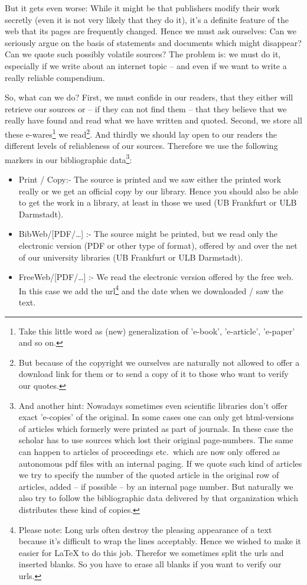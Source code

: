 But it gets even worse: While it might be that publishers modify their work
secretly (even it is not very likely that they do it), it's a definite feature
of the web that its pages are fre\-quen\-tly changed. Hence we must ask
ourselves: Can we seriously argue on the basis of statements and documents which
might disappear? Can we quote such possibly volatile sources? The problem is: we
must do it, especially if we write about an internet topic -- and even if we want
to write a really reliable compendium.

So, what can we do? First, we must confide in our readers, that they either
will retrieve our sources or -- if they can not find them -- that they
believe that we really have found and read what we have written and
quoted. Second, we store all these e-wares\footnote{Take this little word as
(new) generalization of 'e-book', 'e-article', 'e-paper' and so on.} we
read\footnote{But because of the copyright we ourselves are naturally not
allowed to offer a download link for them or to send a copy of it to those who
want to verify our quotes.}. And thirdly we should lay open to our readers the
different levels of reliableness of our sources. Therefore we use
the following markers in our bibliographic data\footnote{And another hint: Nowadays sometimes
even scientific libraries don't offer exact 'e-copies' of the original. In
some cases one can only get html-versions of articles which formerly were
printed as part of journals. In these case the scholar has to use sources which
lost their original page-numbers. The same can happen to articles of proceedings
etc.\ which are now only offered as autonomous pdf files with an internal paging.
If we quote such kind of articles we try to specify the number of the quoted
article in the original row of articles, added -- if possible -- by an internal
page number. But naturally we also try to follow the bibliographic data
delivered by that organization which distributes these kind of copies.}:

\begin{itemize}
  \item Print / Copy:- The source is printed and we saw either the printed work
  really or we get an official copy by our library. Hence you should also be able
  to get the work in a library, at least in those we used (UB Frankfurt or ULB
  Darmstadt).
  \item BibWeb/[PDF/\ldots] :- The source might be printed, but we read only the
  electronic version (PDF or other type of format), offered by and over the
  net of our university libraries (UB Frankfurt or ULB Darmstadt).
  \item FreeWeb/[PDF/\ldots] :- We read the electronic version offered by the
  free web. In this case we add the url\footnote{Please note: Long urls often
  destroy the pleasing appearance of a text because it's difficult to wrap the
  lines acceptably. Hence we wished to make it easier for LaTeX to do this job.
  Therefor we sometimes split the urls and inserted blanks. So you have to erase
  all blanks if you want to verify our urls.} and the date when we downloaded /
  saw the text.
\end{itemize}


%

